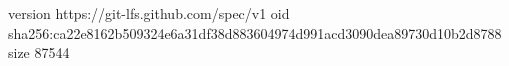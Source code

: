 version https://git-lfs.github.com/spec/v1
oid sha256:ca22e8162b509324e6a31df38d883604974d991acd3090dea89730d10b2d8788
size 87544

